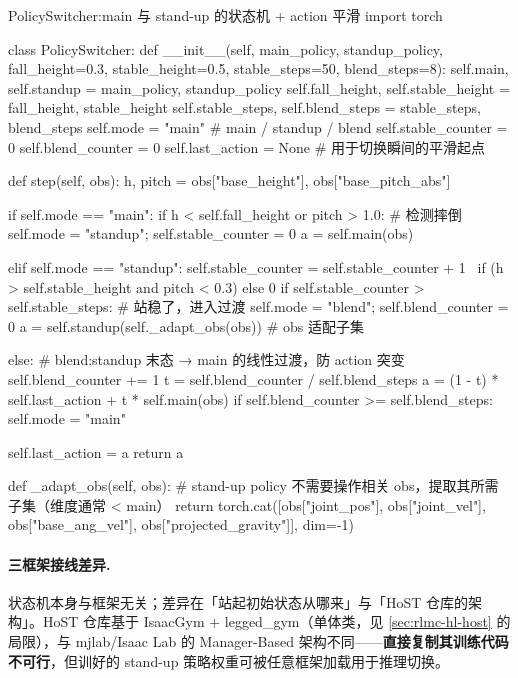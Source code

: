 \begin{codebox}[Python]{PolicySwitcher:main 与 stand-up 的状态机 + action 平滑}
import torch

class PolicySwitcher:
    def __init__(self, main_policy, standup_policy, fall_height=0.3,
                 stable_height=0.5, stable_steps=50, blend_steps=8):
        self.main, self.standup = main_policy, standup_policy
        self.fall_height, self.stable_height = fall_height, stable_height
        self.stable_steps, self.blend_steps = stable_steps, blend_steps
        self.mode = "main"            # main / standup / blend
        self.stable_counter = 0
        self.blend_counter = 0
        self.last_action = None       # 用于切换瞬间的平滑起点

    def step(self, obs):
        h, pitch = obs["base_height"], obs["base_pitch_abs"]

        if self.mode == "main":
            if h < self.fall_height or pitch > 1.0:           # 检测摔倒
                self.mode = "standup"; self.stable_counter = 0
            a = self.main(obs)

        elif self.mode == "standup":
            self.stable_counter = self.stable_counter + 1 \
                if (h > self.stable_height and pitch < 0.3) else 0
            if self.stable_counter > self.stable_steps:        # 站稳了，进入过渡
                self.mode = "blend"; self.blend_counter = 0
            a = self.standup(self._adapt_obs(obs))             # obs 适配子集

        else:  # blend:standup 末态 → main 的线性过渡，防 action 突变
            self.blend_counter += 1
            t = self.blend_counter / self.blend_steps
            a = (1 - t) * self.last_action + t * self.main(obs)
            if self.blend_counter >= self.blend_steps:
                self.mode = "main"

        self.last_action = a
        return a

    def _adapt_obs(self, obs):
        # stand-up policy 不需要操作相关 obs，提取其所需子集（维度通常 < main）
        return torch.cat([obs["joint_pos"], obs["joint_vel"],
                          obs["base_ang_vel"], obs["projected_gravity"]], dim=-1)
\end{codebox}

\paragraph{三框架接线差异.}
状态机本身与框架无关；差异在「站起初始状态从哪来」与「HoST 仓库的架构」。HoST 仓库基于 IsaacGym $+$ legged\_gym（单体类，见 \cref{sec:rlmc-hl-host} 的局限），与 mjlab/Isaac Lab 的 Manager-Based 架构不同——\textbf{直接复制其训练代码不可行}，但训好的 stand-up 策略权重可被任意框架加载用于推理切换。

